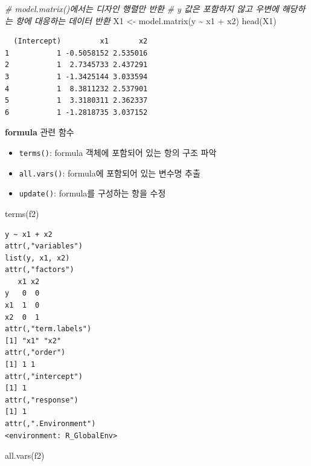 \documentclass[
  11pt,
]{krantz}
\newenvironment{Shaded}{\begin{snugshade}}{\end{snugshade}}
\newcommand{\CommentTok}[1]{\textcolor[rgb]{0.37,0.37,0.37}{\textit{#1}}}
\newcommand{\FunctionTok}[1]{\textcolor[rgb]{0,0,0}{#1}}
\newcommand{\NormalTok}[1]{#1}
\newcommand{\OtherTok}[1]{\textcolor[rgb]{0.37,0.37,0.37}{#1}}
\newcommand{\SpecialCharTok}[1]{\textcolor[rgb]{0,0,0}{#1}}
\providecommand{\tightlist}{%
  \setlength{\itemsep}{0pt}\setlength{\parskip}{0pt}}
\begin{document}
\begin{Shaded}
\begin{Highlighting}[]
\CommentTok{\# model.matrix()에서는 디자인 행렬만 반환}
\CommentTok{\# y 값은 포함하지 않고 우변에 해당하는 항에 대응하는 데이터 반환}
\NormalTok{X1 }\OtherTok{\textless{}{-}} \FunctionTok{model.matrix}\NormalTok{(y }\SpecialCharTok{\textasciitilde{}}\NormalTok{ x1 }\SpecialCharTok{+}\NormalTok{ x2)}
\FunctionTok{head}\NormalTok{(X1)}
\end{Highlighting}
\end{Shaded}

\begin{verbatim}
  (Intercept)         x1       x2
1           1 -0.5058152 2.535016
2           1  2.7345733 2.437291
3           1 -1.3425144 3.033594
4           1  8.3811232 2.537901
5           1  3.3180311 2.362337
6           1 -1.2818735 3.037152
\end{verbatim}

\normalsize

\textbf{formula} 관련 함수

\begin{itemize}
\tightlist
\item
  \texttt{terms()}: formula 객체에 포함되어 있는 항의 구조 파악
\item
  \texttt{all.vars()}: formula에 포함되어 있는 변수명 추출
\item
  \texttt{update()}: formula를 구성하는 항을 수정
\end{itemize}

\footnotesize

\begin{Shaded}
\begin{Highlighting}[]
\FunctionTok{terms}\NormalTok{(f2)}
\end{Highlighting}
\end{Shaded}

\begin{verbatim}
y ~ x1 + x2
attr(,"variables")
list(y, x1, x2)
attr(,"factors")
   x1 x2
y   0  0
x1  1  0
x2  0  1
attr(,"term.labels")
[1] "x1" "x2"
attr(,"order")
[1] 1 1
attr(,"intercept")
[1] 1
attr(,"response")
[1] 1
attr(,".Environment")
<environment: R_GlobalEnv>
\end{verbatim}

\begin{Shaded}
\begin{Highlighting}[]
\FunctionTok{all.vars}\NormalTok{(f2)}
\end{Highlighting}
\end{Shaded}
\end{document}
